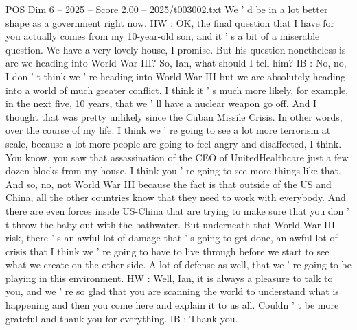 \begin{textsample}{POS Dim 6 – 2025 – Score 2.00 – 2025/t003002.txt}
We ' d be in a lot better shape as a government right now.
HW : OK, the final question that I have for you actually comes from my 10-year-old son, and it ' s a bit of a miserable question.
We have a very lovely house, I promise.
But his question nonetheless is are we heading into World War III?
So, Ian, what should I tell him?
IB : No, no, I don ' t think we ' re heading into World War III but we are absolutely heading into a world of much greater conflict.
I think it ' s much more likely, for example, in the next five, 10 years, that we ' ll have a nuclear weapon go off.
And I thought that was pretty unlikely since the Cuban Missile Crisis.
In other words, over the course of my life.
I think we ' re going to see a lot more terrorism at scale, because a lot more people are going to feel angry and disaffected, I think.
You know, you saw that assassination of the CEO of UnitedHealthcare just a few dozen blocks from my house.
I think you ' re going to see more things like that.
And so, no, not World War III because the fact is that outside of the US and China, all the other countries know that they need to work with everybody.
And there are even forces inside US-China that are trying to make sure that you don ' t throw the baby out with the bathwater.
But underneath that World War III risk, there ' s an awful lot of damage that ' s going to get done, an awful lot of crisis that I think we ' re going to have to live through before we start to see what we create on the other side.
A lot of defense as well, that we ' re going to be playing in this environment.
HW : Well, Ian, it is always a pleasure to talk to you, and we ' re so glad that you are scanning the world to understand what is happening and then you come here and explain it to us all.
Couldn ' t be more grateful and thank you for everything.
IB : Thank you.

\end{textsample}
